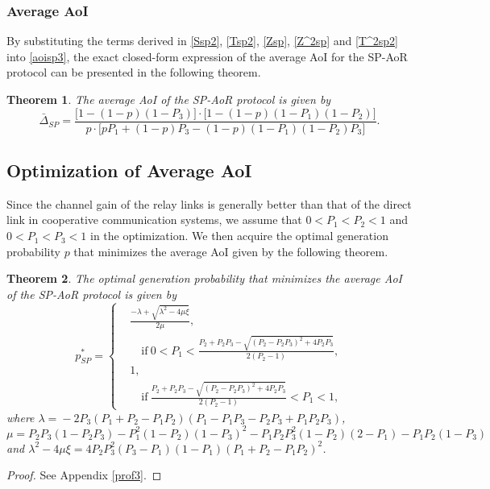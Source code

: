 \documentclass{IEEEtran}
\newtheorem{theorem}{Theorem}
\begin{document}
\subsubsection{Average AoI}
By substituting the terms derived in \eqref{Ssp2}, \eqref{Tsp2}, \eqref{Zsp}, \eqref{Z^2sp} and \eqref{T^2sp2} into \eqref{aoisp3}, the exact closed-form expression of the average AoI for the SP-AoR protocol can be presented in the following theorem.
\begin{theorem}\label{Theorem 1}
	The average AoI of the SP-AoR protocol is given by
	\begin{equation}
	\bar{\Delta}_{SP}\!=\!\frac{\big[1\!-\!(1\!-\!p)(1\!-\!P_{3})\big]\!\cdot\!\big[1\!-\!(1\!-\!p)(1\!-\!P_{1})(1\!-\!P_{2})\big]}{p\!\cdot\!\big[pP_{1}\!+\!(1\!-\!p)P_{3}\!-\!(1\!-\!p)(1\!-\!P_{1})(1\!-\!P_{2})P_{3}\big]}.
	\end{equation}
\end{theorem}

\subsection{Optimization of Average AoI}
Since the channel gain of the relay links is generally better than that of the direct link in cooperative communication systems, we assume that $0<P_{1}<P_{2}<1$ and $0<P_{1}<P_{3}<1$ in the optimization. We then acquire the optimal generation probability $p$ that minimizes the average AoI given by the following theorem.
\begin{theorem} \label{Theorem 2}
	{The optimal generation probability that minimizes the average AoI of the SP-AoR protocol is given by
		\begin{equation}\label{psp}
		p^*_{SP}\!=\!\left\{
		\begin{aligned}
		&\frac{-\!\lambda\!+\!\sqrt{\lambda^2\!-\!4\mu \xi}}{2\mu},\\
		&\quad  \mathrm{if} \ 
		0\!<\!P_{1}\!<\!\frac{P_{2}\!+\!P_{2}P_{3}\!-\!\sqrt{(P_{2}\!-\!P_{2}P_{3})^2\!+\!4P_{2}P_{3}}}{2(P_{2}\!-\!1)},\\
		&1, \\
		&\quad  \mathrm{if} \ 
		\frac{P_{2}\!+\!P_{2}P_{3}\!-\!\sqrt{(P_{2}\!-\!P_{2}P_{3})^2\!+\!4P_{2}P_{3}}}{2(P_{2}\!-\!1)}\!<\!P_{1}\!<\!1,
		\end{aligned} \right.
		\end{equation} 
		\noindent where $\lambda\!=\!-2P_{3}(P_{1}\!+\!P_{2}\!-\!P_{1}P_{2})(P_{1}\!-\!P_{1}P_{3}\!-\!P_{2}P_{3}\!+\!P_{1}P_{2}P_{3})$, $\mu\!=\!P_{2}P_{3}(1\!-\!P_{2}P_{3})\!-\!P_{1}^2(1\!-\!P_{2})(1\!-\!P_{3})^2\!-\!P_{1}P_{2}P_{3}^2(1\!-\!P_{2})(2\!-\!P_{1})\!-\!P_{1}P_{2}(1\!-\!P_{3})$ and $\lambda^2\!-\!4\mu \xi\!=\!4P_{2}P_{3}^2(P_{3}\!-\!P_{1})(1\!-\!P_{1})(P_{1}\!+\!P_{2}\!-\!P_{1}P_{2})^2$.}
\end{theorem}
\begin{proof} 
	See Appendix \ref{prof3}.
\end{proof} 
\end{document}
